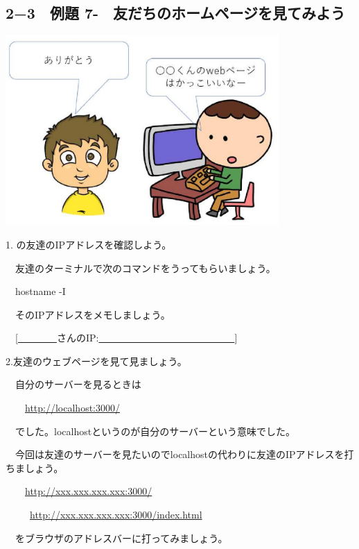 \documentclass[a4paper,12pt,dvipdfmx]{jarticle}
\newcounter{Exercise}
\renewcommand\theExercise{例題 7-\arabic{Exercise}}
\begin{document}
\bigskip


\bigskip


\clearpage\subsection*{2−3　\theExercise　友だちのホームページを見てみよう}
\addtocounter{Exercise}{-1}\label{friend}


\centering
\includegraphics[width=10.423cm]{ome7-img042}
\flushleft


\bigskip



1.
の友達のIPアドレスを確認しよう。

\ \ 友達のターミナルで次のコマンドをうってもらいましょう。

\ \ hostname -I

\ \ そのIPアドレスをメモしましょう。

\ \ [\underline{　　　　}さんのIP:\underline{　　　　　　　　　　　　　　}]


\bigskip

2.友達のウェブページを見て見ましょう。

\ \ 自分のサーバーを見るときは

\ \ 　\url{http://localhost:3000/}

\ \ でした。localhostというのが自分のサーバーという意味でした。

\ \ 今回は友達のサーバーを見たいのでlocalhostの代わりに友達のIPアドレスを打ちましょう。

\ \ 　\url{http://xxx.xxx.xxx.xxx:3000/}

\ \ \ 　\url{http://xxx.xxx.xxx.xxx:3000/index.html}

\ \ をブラウザのアドレスバーに打ってみましょう。
\end{document}
